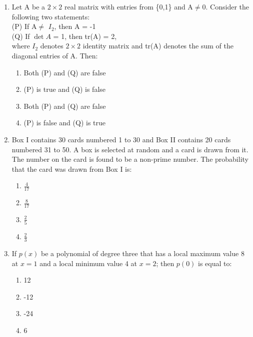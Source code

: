 \documentclass[journal]{IEEEtran}
\begin{document}
\begin{enumerate}
\item Let A be a $2\times2$ real matrix with entries from \{0,1\} and A$\neq$0. Consider the following two statements:\\
(P) If A$\neq$ $I_2$, then A = -1\\
(Q) If $\det{A}$ = 1, then tr(A) = 2,\\
where $I_2$ denotes $2\times2$ identity matrix and tr(A) denotes the sum of the diagonal entries of A. Then:
\begin{multicols}{2}
    \begin{enumerate}
        \item Both (P) and (Q) are false
        \item (P) is true and (Q) is false
        \item Both (P) and (Q) are false
        \item (P) is false and (Q) is true
    \end{enumerate}
\end{multicols}

\item Box I contains 30 cards numbered 1 to 30 and Box II contains 20 cards numbered 31 to 50. A box is selected at random and a card is drawn from it. The number on the card is found to be a non-prime number. The probability that the card was drawn from Box I is:
\begin{multicols}{2}
    \begin{enumerate}
        \item $\frac{4}{17}$
        \item $\frac{8}{17}$
        \item $\frac{2}{5}$
        \item $\frac{2}{3}$
    \end{enumerate}
\end{multicols}

\item If $p(x)$ be a polynomial of degree three that has a local maximum value 8 at $x=1$ and a local minimum value 4 at $x=2$; then $p(0)$ is equal to:
\begin{multicols}{2}
    \begin{enumerate}
        \item 12
        \item -12
        \item -24
        \item 6
    \end{enumerate}
\end{multicols}


\end{enumerate}
\end{document}

